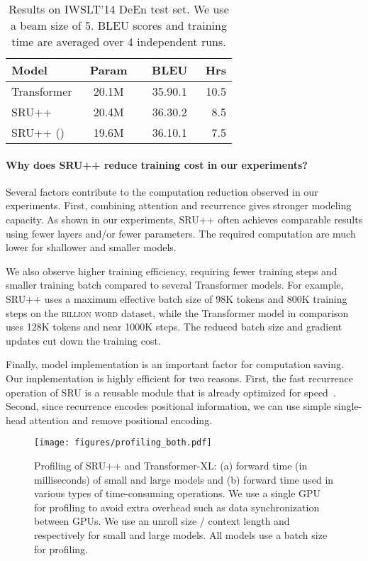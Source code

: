 \begin{table}[!t]
    \centering
    \begin{tabular}{lccr}
    \toprule
    \bf Model & \bf ~Param~ & \bf ~BLEU~ & \bf Hrs\\
    \hline
    Transformer & 20.1M & 35.90.1 & 10.5 \\
    SRU++ & 20.4M & 36.30.2 & 8.5\\
    SRU++ () & 19.6M & 36.10.1 & 7.5\\
    \bottomrule
    \end{tabular}
    \caption{Results on \textsc{IWSLT}'14 DeEn test set. We use a beam size of 5. BLEU scores and training time are averaged over 4 independent runs.}
\label{tab:iwslt}
\end{table}


\paragraph{Why does SRU++ reduce training cost in our experiments?}
Several factors contribute to the computation reduction observed in our experiments. 
First, combining attention and recurrence gives stronger modeling capacity.
As shown in our experiments, SRU++ often achieves comparable results using fewer layers and/or fewer parameters.
The required computation are much lower for shallower and smaller models. 

We also observe higher training efficiency, requiring fewer training steps and smaller training batch compared to several Transformer models.
For example, SRU++ uses a maximum effective batch size of 98K tokens and 800K training steps on the \textsc{billion word} dataset, while the Transformer model in comparison~\cite{baevski2018adaptive} uses 128K tokens and near 1000K steps.
The reduced batch size and gradient updates cut down the training cost.

Finally, model implementation is an important factor for computation saving.
Our implementation is highly efficient for two reasons.
First, the fast recurrence operation of SRU is a reusable module that is already optimized for speed~\cite{lei2018sru}.
Second, since recurrence encodes positional information, we can use simple single-head attention and remove positional encoding.

\begin{figure*}[!t]
\texttt{[image: figures/profiling\_both.pdf]}
    \caption{Profiling of SRU++ and Transformer-XL: (a) forward time (in milliseconds) of small and large models and (b) forward time used in various types of time-consuming operations. We use a single GPU for profiling to avoid extra overhead such as data synchronization between GPUs. We use an unroll size / context length  and  respectively for small and large models. All models use a batch size  for profiling.}
    \label{fig:profiling}
\end{figure*}


